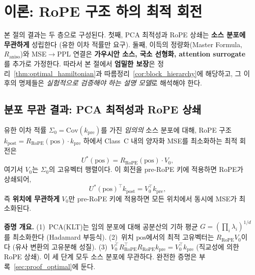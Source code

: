 \section{이론: RoPE 구조 하의 최적 회전}
\label{sec:theory}

본 절의 결과는 두 층으로 구성된다. 첫째, PCA 최적성과 RoPE 상쇄는 \textbf{소스 분포에 무관하게} 성립한다 (유한 이차 적률만 요구). 둘째, 이득의 정량화(Master Formula, $R_{\mathrm{aniso}}$)와 MSE$\to$PPL 연결은 \textbf{가우시안 소스, 국소 선형화, attention surrogate}를 추가로 가정한다. 따라서 본 절에서 \textbf{엄밀한 보장}은 정리~\ref{thm:optimal_hamiltonian}과 따름정리~\ref{cor:block_hierarchy}에 해당하고, 그 이후의 명제들은 \emph{실험적으로 검증해야 하는 설명 모델}로 해석해야 한다.

\subsection{분포 무관 결과: PCA 최적성과 RoPE 상쇄}

\begin{theorem}[RoPE-최적 회전 --- 분포 무관]
\label{thm:optimal_hamiltonian}
유한 이차 적률 $\Sigma_0 = \mathrm{Cov}(k_{\mathrm{pre}})$를 가진 \emph{임의의} 소스 분포에 대해, RoPE 구조 $k_{\mathrm{post}} = R_{\mathrm{RoPE}}(\mathrm{pos}) \cdot k_{\mathrm{pre}}$ 하에서 Class~C 내의 양자화 MSE를 최소화하는 최적 회전은
\begin{equation}
U^*(\mathrm{pos}) = R_{\mathrm{RoPE}}(\mathrm{pos}) \cdot V_0,
\end{equation}
여기서 $V_0$는 $\Sigma_0$의 고유벡터 행렬이다. 이 회전을 pre-RoPE 키에 적용하면 RoPE가 상쇄되어,
\begin{equation}
U^*(\mathrm{pos})^\top k_{\mathrm{post}} = V_0^\top k_{\mathrm{pre}},
\end{equation}
즉 \textbf{위치에 무관하게} $V_0$만 pre-RoPE 키에 적용하면 모든 위치에서 동시에 MSE가 최소화된다.
\end{theorem}

\begin{theorycomment}
\textbf{증명 개요.} (1)~PCA(KLT)는 임의 분포에 대해 공분산의 기하 평균 $G = (\prod_i \lambda_i)^{1/d}$를 최소화한다 (Hadamard 부등식). (2)~위치 $\mathrm{pos}$에서의 최적 고유벡터는 $R_{\mathrm{RoPE}} V_0$이다 (유사 변환의 고유분해 성질). (3)~$V_0^\top R_{\mathrm{RoPE}}^\top R_{\mathrm{RoPE}} k_{\mathrm{pre}} = V_0^\top k_{\mathrm{pre}}$ (직교성에 의한 RoPE 상쇄). 이 세 단계 모두 소스 분포에 무관하다. 완전한 증명은 부록~\ref{sec:proof_optimal}에 둔다.
\end{theorycomment}

